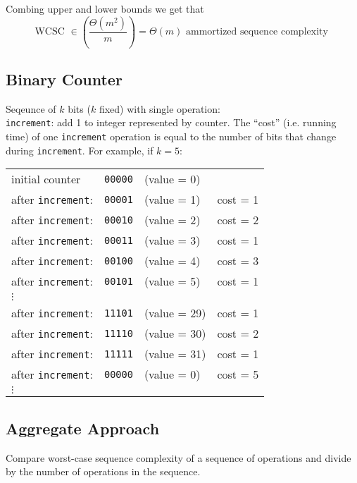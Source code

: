 \noindent Combing upper and lower bounds we get that
$$ \textrm{WCSC } \in \left ( \frac{\Theta(m^2)}{m} \right ) = \Theta(m) \textrm{ ammortized sequence complexity } $$

\subsection*{Binary Counter}

Seqeunce of $k$ bits ($k$ fixed) with single operation: \\
\texttt{increment}: add 1 to integer represented by counter. The ``cost'' (i.e. running time) of one \texttt{increment} operation is equal to the number of bits that change during \texttt{increment}. For example, if $k = 5$: \\

\begin{tabular}{l l l l}
  initial counter & \texttt{00000} & (value = 0) \\
	after \texttt{increment}: & \texttt{00001} & (value = 1) & cost = 1 \\
	after \texttt{increment}: & \texttt{00010} & (value = 2) & cost = 2 \\
	after \texttt{increment}: & \texttt{00011} & (value = 3) & cost = 1 \\
	after \texttt{increment}: & \texttt{00100} & (value = 4) & cost = 3 \\
	after \texttt{increment}: & \texttt{00101} & (value = 5) & cost = 1 \\
	$\vdots$ & & & \\
	after \texttt{increment}: & \texttt{11101} & (value = 29) & cost = 1 \\
	after \texttt{increment}: & \texttt{11110} & (value = 30) & cost = 2 \\
	after \texttt{increment}: & \texttt{11111} & (value = 31) & cost = 1 \\
	after \texttt{increment}: & \texttt{00000} & (value = 0) & cost = 5 \\
	$\vdots$ & & &
\end{tabular}

\subsection*{Aggregate Approach}

\noindent Compare worst-case sequence complexity of a sequence of operations and divide by the number of operations in the sequence. \\

